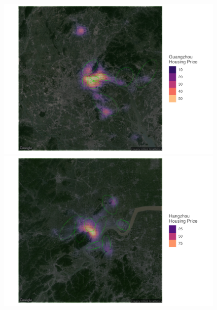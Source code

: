 \begin{figure}[h!]
\begin{scriptsize}
    \begin{minipage}{0.328\textwidth}
        \includegraphics[width=\linewidth]{../figures/distribution_of_hp_and_broker/Guangzhou.pdf}
    \end{minipage}
    \hfill
    \begin{minipage}{0.328\textwidth}
        \includegraphics[width=\linewidth]{../figures/distribution_of_hp_and_broker/Hangzhou.pdf}
    \end{minipage}
    \begin{minipage}{0.328\textwidth}

\end{minipage}
\end{scriptsize}
\end{figure}
